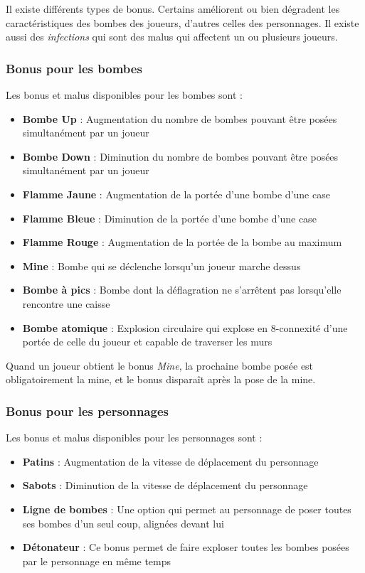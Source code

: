 Il existe différents types de bonus. Certains améliorent ou bien dégradent les caractéristiques des bombes des joueurs, d'autres celles des personnages. Il existe aussi des \textit{infections} qui sont des malus qui affectent un ou plusieurs joueurs.

\subsubsection{Bonus pour les bombes}

Les bonus et malus disponibles pour les bombes sont :
\begin{itemize}
\item \textbf{Bombe Up} : Augmentation du nombre de bombes pouvant être posées simultanément par un joueur
\item \textbf{Bombe Down} : Diminution du nombre de bombes pouvant être posées simultanément par un joueur
\item \textbf{Flamme Jaune} : Augmentation de la portée d'une bombe d'une case
\item \textbf{Flamme Bleue} : Diminution de la portée d'une bombe d'une case
\item \textbf{Flamme Rouge} : Augmentation de la portée de la bombe au maximum
\item \textbf{Mine} : Bombe qui se déclenche lorsqu'un joueur marche dessus
\item \textbf{Bombe à pics} : Bombe dont la déflagration ne s'arrêtent pas lorsqu'elle rencontre une caisse
\item \textbf{Bombe atomique} : Explosion circulaire qui explose en 8-connexité d'une portée de celle du joueur et capable de traverser les murs
\end{itemize}

\vspace{0.3cm}

Quand un joueur obtient le bonus \textit{Mine}, la prochaine bombe posée est obligatoirement la mine, et le bonus disparaît après la pose de la mine.

\subsubsection{Bonus pour les personnages}

Les bonus et malus disponibles pour les personnages sont :
\begin{itemize}
\item \textbf{Patins} : Augmentation de la vitesse de déplacement du personnage
\item \textbf{Sabots} : Diminution de la vitesse de déplacement du personnage
\item \textbf{Ligne de bombes} : Une option qui permet au personnage de poser toutes ses bombes d'un seul coup, alignées devant lui
\item \textbf{Détonateur} : Ce bonus permet de faire exploser toutes les bombes posées par le personnage en même temps
\end{itemize}

